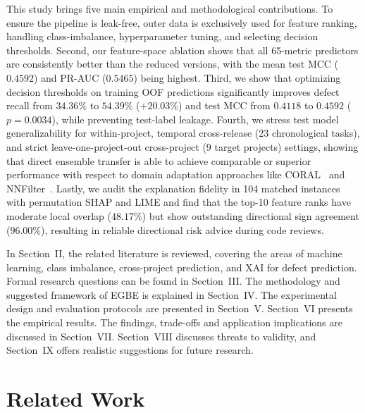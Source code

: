 \documentclass[conference]{IEEEtran}
\begin{document}
This study brings five main empirical and methodological contributions.
To ensure the pipeline is leak-free, outer data is exclusively used for feature ranking, handling class-imbalance, hyperparameter tuning, and selecting decision thresholds.
Second, our feature-space ablation shows that all 65-metric predictors are consistently better than the reduced versions, with the mean test MCC ($0.4592$) and PR-AUC ($0.5465$) being highest.
Third, we show that optimizing decision thresholds on training OOF predictions significantly improves defect recall from $34.36\%$ to $54.39\%$ (+$20.03\%$) and test MCC from $0.4118$ to $0.4592$ ($p = 0.0034$), while preventing test-label leakage.
Fourth, we stress test model generalizability for within-project, temporal cross-release (23 chronological tasks), and strict leave-one-project-out cross-project (9 target projects) settings, showing that direct ensemble transfer is able to achieve comparable or superior performance with respect to domain adaptation approaches like CORAL~\cite{sun2016coral} and NNFilter~\cite{turhan2009crosscompany}.
Lastly, we audit the explanation fidelity in 104 matched instances with permutation SHAP and LIME and find that the top-10 feature ranks have moderate local overlap ($48.17\%$) but show outstanding directional sign agreement ($96.00\%$), resulting in reliable directional risk advice during code reviews.

In Section~II, the related literature is reviewed, covering the areas of machine learning, class imbalance, cross-project prediction, and XAI for defect prediction. Formal research questions can be found in Section~III. The methodology and suggested framework of EGBE is explained in Section~IV. The experimental design and evaluation protocols are presented in Section~V. Section~VI presents the empirical results. The findings, trade-offs and application implications are discussed in Section~VII. Section~VIII discusses threats to validity, and Section~IX offers realistic suggestions for future research.

\section{Related Work}
\label{sec:related-work}
\end{document}
